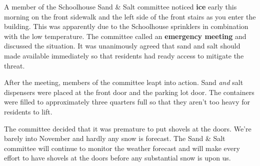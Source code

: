 \documentclass[letterpaper,12pt]{texMemo}
\begin{document}
\maketitle

A member of the Schoolhouse Sand \& Salt committee noticed \textbf{ice} early this morning on the front sidewalk and the left side of the front stairs as you enter the building. This was apparently due to the Schoolhouse sprinklers in combination with the low temperature. The committee called an \textbf{emergency meeting} and discussed the situation. It was unanimously agreed that sand and salt should made available immediately so that residents had ready access to mitigate the threat.

After the meeting, members of the committee leapt into action. Sand \emph{and} salt dispensers were placed at the front door and the parking lot door. The containers were filled to approximately three quarters full so that they aren't too heavy for residents to lift.

The committee decided that it was premature to put shovels at the doors. We're barely into November and hardly any snow is forecast. The Sand \& Salt committee will continue to monitor the weather forecast and will make every effort to have shovels at the doors before any substantial snow is upon us.
\end{document}
